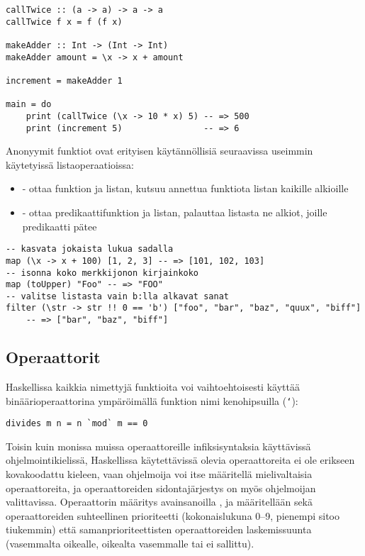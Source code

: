 \begin{verbatim}
callTwice :: (a -> a) -> a -> a
callTwice f x = f (f x)

makeAdder :: Int -> (Int -> Int)
makeAdder amount = \x -> x + amount

increment = makeAdder 1

main = do
    print (callTwice (\x -> 10 * x) 5) -- => 500
    print (increment 5)                -- => 6
\end{verbatim}
Anonyymit funktiot ovat erityisen käytännöllisiä seuraavissa useimmin käytetyissä listaoperaatioissa:
\begin{itemize}
    \item {} - ottaa funktion ja listan, kutsuu annettua funktiota listan kaikille alkioille
    \item {} - ottaa predikaattifunktion ja listan, palauttaa listasta ne alkiot, joille predikaatti pätee
\end{itemize}
\begin{verbatim}
-- kasvata jokaista lukua sadalla
map (\x -> x + 100) [1, 2, 3] -- => [101, 102, 103]
-- isonna koko merkkijonon kirjainkoko
map (toUpper) "Foo" -- => "FOO"
-- valitse listasta vain b:lla alkavat sanat
filter (\str -> str !! 0 == 'b') ["foo", "bar", "baz", "quux", "biff"]
    -- => ["bar", "baz", "biff"]
\end{verbatim}

\subsection{Operaattorit}
Haskellissa kaikkia nimettyjä funktioita voi vaihtoehtoisesti käyttää binäärioperaattorina ympäröimällä funktion nimi kenohipsuilla (\texttt{`}):
\begin{verbatim}
divides m n = n `mod` m == 0
\end{verbatim}

Toisin kuin monissa muissa operaattoreille infiksisyntaksia käyttävissä ohjelmointikielissä,
Haskellissa käytettävissä olevia operaattoreita ei ole erikseen kovakoodattu kieleen,
vaan ohjelmoija voi itse määritellä mielivaltaisia operaattoreita,
ja operaattoreiden sidontajärjestys on myös ohjelmoijan valittavissa.
Operaattorin määritys avainsanoilla ,  ja  määritellään sekä
operaattoreiden suhteellinen prioriteetti (kokonaislukuna 0--9, pienempi sitoo tiukemmin) että
samanprioriteettisten operaattoreiden laskemissuunta
(vasemmalta oikealle, oikealta vasemmalle tai ei sallittu).

